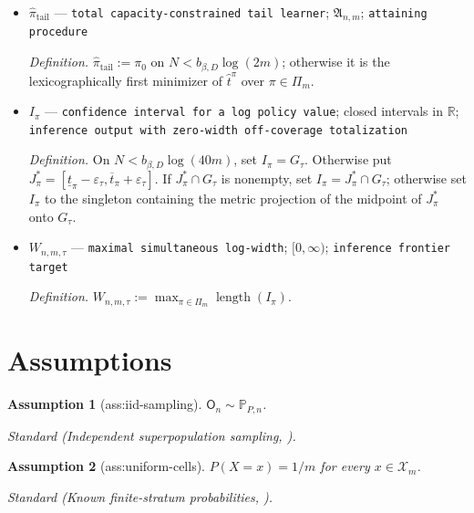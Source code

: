 \documentclass{article}
\newtheorem{assumption}{Assumption}
\begin{document}
\begin{itemize}
  \par\smallskip\noindent\emph{Definition.} The maximum over the same product region used for \(\underline t_{\pi}\) of the unique root of \(m^{-1}\sum_x\exp(\widetilde v_x-\widetilde\alpha_xt)=\tau\).
  \item \(\widehat\pi_{\mathrm{tail}}\) --- \texttt{total capacity-\allowbreak{}constrained tail learner}; \(\mathfrak A_{n,m}\); \texttt{attaining procedure}
  \par\smallskip\noindent\emph{Definition.} \(\widehat\pi_{\mathrm{tail}}:=\pi_0\) on \(N<b_{\beta,D}\log(2m)\); otherwise it is the lexicographically first minimizer of \(\widehat t^{\pi}\) over \(\pi\in\Pi_m\).
  \item \(I_{\pi}\) --- \texttt{confidence interval for a log policy value}; closed intervals in \(\mathbb R\); \texttt{inference output with zero-\allowbreak{}width off-\allowbreak{}coverage totalization}
  \par\smallskip\noindent\emph{Definition.} On \(N<b_{\beta,D}\log(40m)\), set \(I_{\pi}=G_{\tau}\). Otherwise put \(J^*_{\pi}=[\underline t_{\pi}-\varepsilon_{\tau},\overline t_{\pi}+\varepsilon_{\tau}]\). If \(J^*_{\pi}\cap G_{\tau}\) is nonempty, set \(I_{\pi}=J^*_{\pi}\cap G_{\tau}\); otherwise set \(I_{\pi}\) to the singleton containing the metric projection of the midpoint of \(J^*_{\pi}\) onto \(G_{\tau}\).
  \item \(W_{n,m,\tau}\) --- \texttt{maximal simultaneous log-\allowbreak{}width}; \([0,\infty)\); \texttt{inference frontier target}
  \par\smallskip\noindent\emph{Definition.} \(W_{n,m,\tau}:=\max_{\pi\in\Pi_m}\operatorname{length}(I_{\pi})\).
\end{itemize}

\section{Assumptions}

\begin{assumption}[ass:iid-sampling]\label{ass:iid-sampling}
\(\mathsf O_n\sim\mathbb P_{P,n}\).
\par\smallskip\noindent\emph{Standard} (Independent superpopulation sampling, \cite{AtheyWager2021}).
\end{assumption}

\begin{assumption}[ass:uniform-cells]\label{ass:uniform-cells}
\(P(X=x)=1/m\) for every \(x\in\mathcal X_m\).
\par\smallskip\noindent\emph{Standard} (Known finite-stratum probabilities, \cite{KitagawaTetenov2018}).
\end{assumption}
\end{document}
